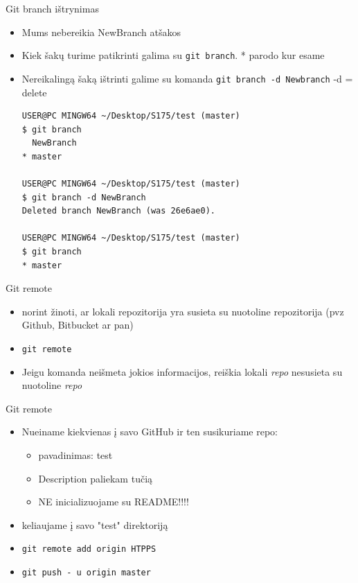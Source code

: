\documentclass[11pt,xcolor=table]{beamer}
\begin{document}
\begin{frame}[fragile]{Git branch ištrynimas}
\begin{itemize}
\item Mums nebereikia NewBranch atšakos
\item Kiek šakų turime patikrinti galima su \colorbox{listinggray}{\lstinline|git branch|}. * parodo kur esame
\item Nereikalingą šaką ištrinti galime su komanda \colorbox{listinggray}{\lstinline|git branch -d Newbranch|} -d = delete
\begin{lstlisting}
USER@PC MINGW64 ~/Desktop/S175/test (master)
$ git branch
  NewBranch
* master

USER@PC MINGW64 ~/Desktop/S175/test (master)
$ git branch -d NewBranch
Deleted branch NewBranch (was 26e6ae0).

USER@PC MINGW64 ~/Desktop/S175/test (master)
$ git branch
* master
\end{lstlisting}
\end{itemize}
\end{frame}


\begin{frame}{Git remote}
\begin{itemize}
\item norint žinoti, ar lokali repozitorija yra susieta su nuotoline repozitorija (pvz Github, Bitbucket ar pan)
\item \colorbox{listinggray}{\lstinline|git remote|}
\item Jeigu komanda neišmeta jokios informacijos, reiškia lokali \textit{repo} nesusieta su nuotoline \textit{repo}
\end{itemize}
\end{frame}


\begin{frame}{Git remote}
\begin{itemize}
\item Nueiname kiekvienas į savo GitHub ir ten susikuriame repo:
\begin{itemize}
\item pavadinimas: test
\item Description paliekam tučią
\item NE inicializuojame su README!!!!
\end{itemize}
\item keliaujame į savo "test" direktoriją
\item \colorbox{listinggray}{\lstinline|git remote add origin HTPPS|}
\item \colorbox{listinggray}{\lstinline|git push - u origin master|}
\end{itemize}
\end{frame}
\end{document}
